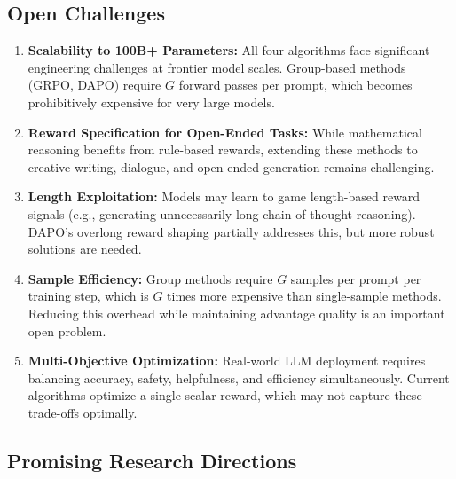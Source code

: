 \subsection{Open Challenges}

\begin{enumerate}[leftmargin=*, itemsep=2pt]
\item \textbf{Scalability to 100B+ Parameters:} All four algorithms face significant engineering challenges at frontier model scales. Group-based methods (GRPO, DAPO) require $G$ forward passes per prompt, which becomes prohibitively expensive for very large models.
\item \textbf{Reward Specification for Open-Ended Tasks:} While mathematical reasoning benefits from rule-based rewards, extending these methods to creative writing, dialogue, and open-ended generation remains challenging.
\item \textbf{Length Exploitation:} Models may learn to game length-based reward signals (e.g., generating unnecessarily long chain-of-thought reasoning). DAPO's overlong reward shaping partially addresses this, but more robust solutions are needed.
\item \textbf{Sample Efficiency:} Group methods require $G$ samples per prompt per training step, which is $G$ times more expensive than single-sample methods. Reducing this overhead while maintaining advantage quality is an important open problem.
\item \textbf{Multi-Objective Optimization:} Real-world LLM deployment requires balancing accuracy, safety, helpfulness, and efficiency simultaneously. Current algorithms optimize a single scalar reward, which may not capture these trade-offs optimally.
\end{enumerate}

\subsection{Promising Research Directions}

